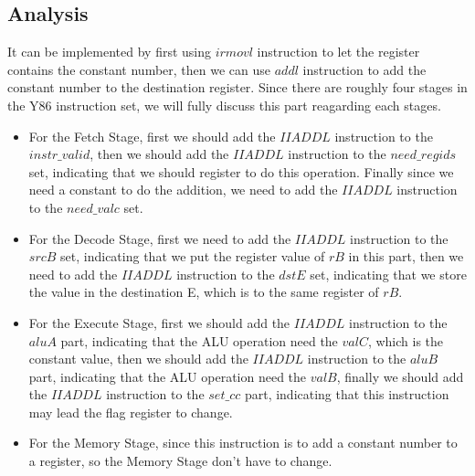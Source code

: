 \documentclass[12pt,a4paper]{article}
\theoremstyle{definition}
\numberwithin{equation}{section}
\numberwithin{figure}{section}
\begin{document}
\subsection{Analysis}
It can be implemented by first using $irmovl$ instruction to let the register contains the constant number, then we can use $addl$ instruction to add the constant number to the destination register. Since there are roughly four stages in the Y86 instruction set, we will fully discuss this part reagarding each stages.
\begin{itemize}
	\item For the Fetch Stage, first we should add the $IIADDL$ instruction to the $instr\_valid$, then we should add the $IIADDL$ instruction to the $need\_regids$ set, indicating that we should register to do this operation. Finally since we need a constant to do the addition, we need to add the $IIADDL$ instruction to the $need\_valc$ set.
	\item For the Decode Stage, first we need to add the $IIADDL$ instruction to the $srcB$ set, indicating that we put the register value of $rB$ in this part, then we need to add the $IIADDL$ instruction to the $dstE$ set, indicating that we store the value in the destination E, which is to the same register of $rB$.
	\item For the Execute Stage, first we should add the $IIADDL$ instruction to the $aluA$ part, indicating that the ALU operation need the $valC$, which is the constant value, then we should add the $IIADDL$ instruction to the $aluB$ part, indicating that the ALU operation need the $valB$, finally we should add the $IIADDL$ instruction to the $set\_cc$ part, indicating that this instruction may lead the flag register to change.
	\item For the Memory Stage, since this instruction is to add a constant number to a register, so the Memory Stage don't have to change.
\end{itemize}
\end{document}
